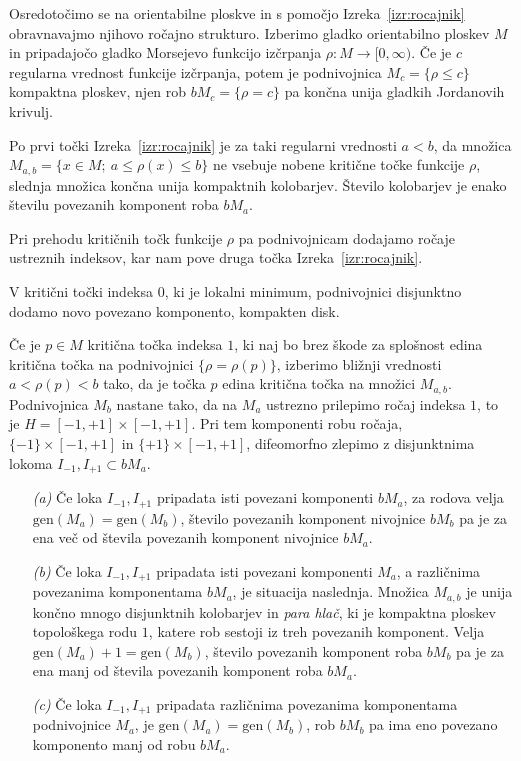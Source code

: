 \documentclass[12pt,a4paper,twoside]{article}
\theoremstyle{definition} %
\theoremstyle{plain} %
\numberwithin{equation}{section}  %
\begin{document}
Osredotočimo se na orientabilne ploskve in s pomočjo Izreka~\ref{izr:rocajnik} obravnavajmo njihovo ročajno strukturo. 
Izberimo gladko orientabilno ploskev $M$ in pripadajočo gladko Morsejevo funkcijo izčrpanja $\rho \colon M \to [0, \infty)$. Če je $c$ regularna vrednost funkcije izčrpanja, potem je podnivojnica $M_{c} = \{ \rho \leq c \}$ kompaktna ploskev, njen rob $bM_{c} = \{ \rho = c \}$ pa končna unija gladkih Jordanovih krivulj. 

Po prvi točki Izreka~\ref{izr:rocajnik} je za taki regularni vrednosti $a<b$, da množica $M_{a,b} = \{ x \in M; \ a \leq \rho(x) \leq b \}$ ne vsebuje nobene kritične točke funkcije $\rho$, slednja množica končna unija kompaktnih kolobarjev. Število kolobarjev je enako številu povezanih komponent roba $bM_{a}$.

Pri prehodu kritičnih točk funkcije $\rho$ pa podnivojnicam dodajamo ročaje ustreznih indeksov, kar nam pove druga točka Izreka~\ref{izr:rocajnik}.

V kritični točki indeksa $0$, ki je lokalni minimum, podnivojnici disjunktno dodamo novo povezano komponento, kompakten disk.

Če je $p \in M$ kritična točka indeksa $1$, ki naj bo brez škode za splošnost edina kritična točka na podnivojnici $\{ \rho = \rho(p) \}$, izberimo bližnji vrednosti $a<\rho(p)<b$ tako, da je točka $p$ edina kritična točka na množici $M_{a,b}$. Podnivojnica $M_{b}$ nastane tako, da na $M_{a}$ ustrezno prilepimo ročaj indeksa $1$, to je $H = [-1,+1] \times [-1,+1]$. Pri tem komponenti robu ročaja, $\{-1\} \times [-1,+1]$ in $\{+1\} \times [-1,+1]$, difeomorfno zlepimo z disjunktnima lokoma $I_{-1}, I_{+1} \subset bM_{a}$.
\begin{itemize}
\item[\textit{(a)}] 
	Če loka $I_{-1}, I_{+1}$ pripadata isti povezani komponenti $bM_{a}$, za rodova velja $\text{gen}(M_{a}) = \text{gen}(M_{b})$, število povezanih komponent nivojnice $bM_{b}$ pa je za ena več od števila povezanih komponent nivojnice $bM_{a}$.
\item[\textit{(b)}]
	Če loka $I_{-1}, I_{+1}$ pripadata isti povezani komponenti $M_{a}$, a različnima povezanima komponentama $bM_{a}$, je situacija naslednja.
	Množica $M_{a,b}$ je unija končno mnogo disjunktnih kolobarjev in \emph{para hlač}, ki je kompaktna ploskev topološkega rodu $1$, katere rob sestoji iz treh povezanih komponent.
	Velja $\text{gen}(M_{a})+1 = \text{gen}(M_{b})$, število povezanih komponent roba $bM_{b}$ pa je za ena manj od števila povezanih komponent roba $bM_{a}$.
\item[\textit{(c)}]
	Če loka $I_{-1}, I_{+1}$ pripadata različnima povezanima komponentama podnivojnice $M_{a}$, je $\text{gen}(M_{a}) = \text{gen}(M_{b})$, rob $bM_{b}$ pa ima eno povezano komponento manj od robu $bM_{a}$.
\end{itemize}
\end{document}
